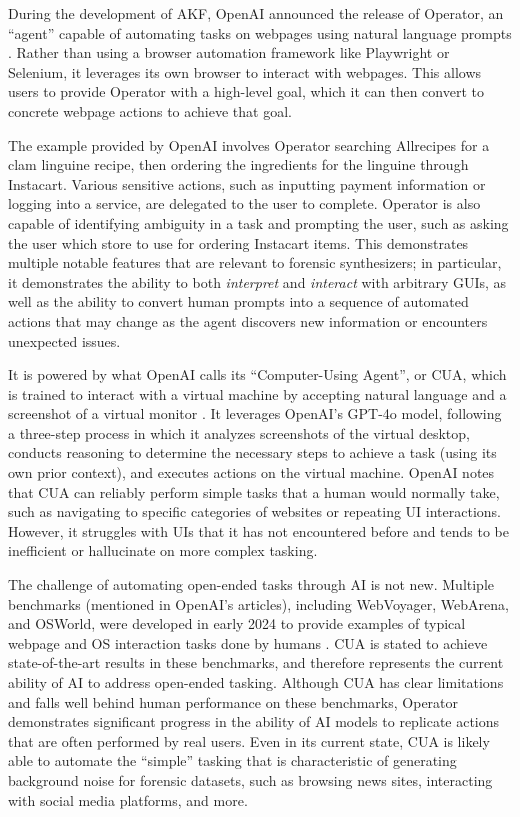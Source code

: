 \documentclass[letterpaper,12pt]{report}
\begin{document}
During the development of AKF, OpenAI announced the release of Operator,
an ``agent'' capable of automating tasks on webpages using natural
language prompts \cite{openaiIntroducingOperator2025}. Rather than
using a browser automation framework like Playwright or Selenium, it
leverages its own browser to interact with webpages. This allows users
to provide Operator with a high-level goal, which it can then convert to
concrete webpage actions to achieve that goal.

The example provided by OpenAI involves Operator searching Allrecipes
for a clam linguine recipe, then ordering the ingredients for the
linguine through Instacart. Various sensitive actions, such as inputting
payment information or logging into a service, are delegated to the user
to complete. Operator is also capable of identifying ambiguity in a task
and prompting the user, such as asking the user which store to use for
ordering Instacart items. This demonstrates multiple notable features
that are relevant to forensic synthesizers; in particular, it
demonstrates the ability to both \emph{interpret} and \emph{interact}
with arbitrary GUIs, as well as the ability to convert human prompts
into a sequence of automated actions that may change as the agent
discovers new information or encounters unexpected issues.

It is powered by what OpenAI calls its ``Computer-Using Agent'', or CUA,
which is trained to interact with a virtual machine by accepting natural
language and a screenshot of a virtual monitor
\cite{openaiComputerUsingAgent2025}. It leverages OpenAI's GPT-4o
model, following a three-step process in which it analyzes screenshots
of the virtual desktop, conducts reasoning to determine the necessary
steps to achieve a task (using its own prior context), and executes
actions on the virtual machine. OpenAI notes that CUA can reliably
perform simple tasks that a human would normally take, such as
navigating to specific categories of websites or repeating UI
interactions. However, it struggles with UIs that it has not encountered
before and tends to be inefficient or hallucinate on more complex
tasking.

The challenge of automating open-ended tasks through AI is not new.
Multiple benchmarks (mentioned in OpenAI's articles), including
WebVoyager, WebArena, and OSWorld, were developed in early 2024 to
provide examples of typical webpage and OS interaction tasks done by
humans
\cite{zhouWebArenaRealisticWeb2024,heWebVoyagerBuildingEndtoEnd2024,xieOSWorldBenchmarkingMultimodal2024}.
CUA is stated to achieve state-of-the-art results in these benchmarks,
and therefore represents the current ability of AI to address open-ended
tasking. Although CUA has clear limitations and falls well behind human
performance on these benchmarks, Operator demonstrates significant
progress in the ability of AI models to replicate actions that are often
performed by real users. Even in its current state, CUA is likely able
to automate the ``simple'' tasking that is characteristic of generating
background noise for forensic datasets, such as browsing news sites,
interacting with social media platforms, and more.
\end{document}
